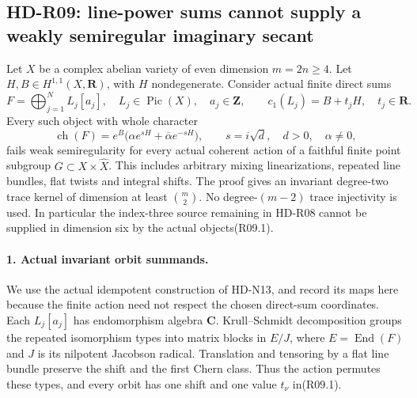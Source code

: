 \subsection{HD-R09: line-power sums cannot supply a weakly semiregular imaginary secant}
\label{sec:line-power-secant-obstruction}

Let $X$ be a complex abelian variety of even dimension $m=2n\ge4$.
Let $H,B\in H^{1,1}(X,\mathbf R)$, with $H$ nondegenerate.
Consider actual finite direct sums
\[
 F=\bigoplus_{j=1}^N L_j[a_j],\quad
 L_j\in\operatorname{Pic}(X),\quad a_j\in\mathbf Z,
 \qquad c_1(L_j)=B+t_jH,\quad t_j\in\mathbf R.              \tag{R09.1}
\]
Every such object with whole character
\[
       \operatorname{ch}(F)=e^B
              \bigl(\alpha e^{sH}+\overline\alpha e^{-sH}\bigr),
       \qquad s=i\sqrt d,\quad d>0,\quad\alpha\ne0,          \tag{R09.2}
\]
fails weak semiregularity for every actual coherent action of a
faithful finite point subgroup $G\subset X\times\widehat X$.
This includes arbitrary mixing linearizations, repeated line bundles,
flat twists and integral shifts. The proof gives an invariant
degree-two trace kernel of dimension at least $\binom m2$.
No degree-$(m-2)$ trace injectivity is used. In particular the
index-three source remaining in HD-R08 cannot be supplied in
dimension six by the actual objects(R09.1).

\paragraph{1. Actual invariant orbit summands.}
We use the actual idempotent construction of HD-N13, and record
its maps here because the finite action need not respect the
chosen direct-sum coordinates. Each $L_j[a_j]$ has endomorphism
algebra $\mathbf C$. Krull--Schmidt decomposition groups the
repeated isomorphism types into matrix blocks in
$E/J$, where $E=\operatorname{End}(F)$ and $J$ is its
nilpotent Jacobson radical. Translation and tensoring by a flat
line bundle preserve the shift and the first Chern class.
Thus the action permutes these types, and every orbit has
one shift and one value $t_\nu$ in(R09.1).

